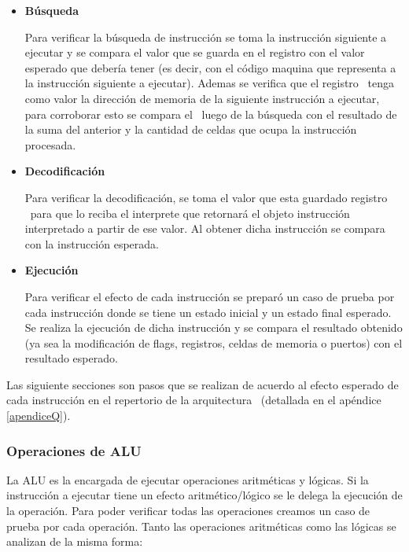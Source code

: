 \begin{itemize}
\item \textbf{Búsqueda} 

Para verificar la búsqueda de instrucción se toma la instrucción siguiente a ejecutar y se compara el valor que se guarda en el registro \IR con el valor esperado que debería tener (es decir, con el código maquina que representa a la instrucción siguiente a ejecutar). Ademas se verifica que el registro \PC\ tenga como valor la dirección de memoria de la siguiente instrucción a ejecutar, para corroborar esto se compara el \PC\ luego de la búsqueda con el resultado de la suma del \PC anterior y la cantidad de celdas que ocupa la instrucción procesada.

\item \textbf{Decodificación}

Para verificar la decodificación, se toma el valor que esta guardado registro \IR\ para que lo reciba el interprete que retornará el objeto instrucción interpretado a partir de ese valor. Al obtener dicha instrucción se compara con la instrucción esperada.
 
\item \textbf{Ejecución}

Para verificar el efecto de cada instrucción se preparó un caso de prueba por cada instrucción donde se tiene un estado inicial y un estado final esperado. Se realiza la ejecución de dicha instrucción y se compara el resultado obtenido (ya sea la modificación de flags, registros, celdas de memoria o puertos) con el resultado esperado. 

\end{itemize}

Las siguiente secciones son pasos que se realizan de acuerdo al efecto esperado de cada instrucción en el repertorio de la arquitectura \Q\ (detallada en el apéndice \ref{apendiceQ}).
  
\subsubsection{Operaciones de ALU}

La ALU es la encargada de ejecutar operaciones aritméticas y lógicas. Si la instrucción a ejecutar tiene un efecto aritmético/lógico se le delega la ejecución de la operación. Para poder verificar todas las operaciones creamos un caso de prueba por cada operación. Tanto las operaciones aritméticas como las lógicas se analizan de la misma forma:

